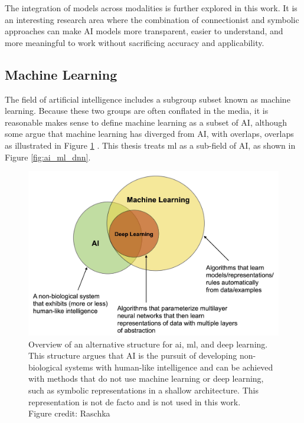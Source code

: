     The integration of models across modalities is further explored in this work. It is an interesting research area where the combination of connectionist and symbolic approaches can make AI models more transparent, easier to understand, and more meaningful to work without sacrificing accuracy and applicability.


    \subsection{Machine Learning}

    The field of artificial intelligence includes a subgroup subset known as machine learning. Because these two groups are often conflated in the media, it is reasonable makes sense to define machine learning as a subset of AI, although some argue that machine learning has diverged from AI, with overlaps, overlaps as illustrated in Figure \ref{fig:ai_ml_dnn_argue} \cite{raschkaChapterIntroductionMachine2020}. This thesis treats \gls{ml} as a sub-field of AI, as shown in Figure \ref{fig:ai_ml_dnn}.


    \begin{figure}[htb]
        \centering
        \includegraphics[width=\linewidth]{images/ai_ml_dnn_argue.jpeg}
        \caption[Overview of an alternative structure for \gls{ai}, \gls{ml}, and deep learning. This structure argues that AI is the pursuit of developing non-biological systems with human-like intelligence and can be achieved with methods that do not use machine learning or deep learning, such as symbolic representations in a shallow architecture.]{Overview of an alternative structure for \gls{ai}, \gls{ml}, and deep learning. This structure argues that AI is the pursuit of developing non-biological systems with human-like intelligence and can be achieved with methods that do not use machine learning or deep learning, such as symbolic representations in a shallow architecture. This representation is not de facto and is not used in this work.\\Figure credit: Raschka \cite{raschkaChapterIntroductionMachine2020}}
        \label{fig:ai_ml_dnn_argue}
    \end{figure} 

